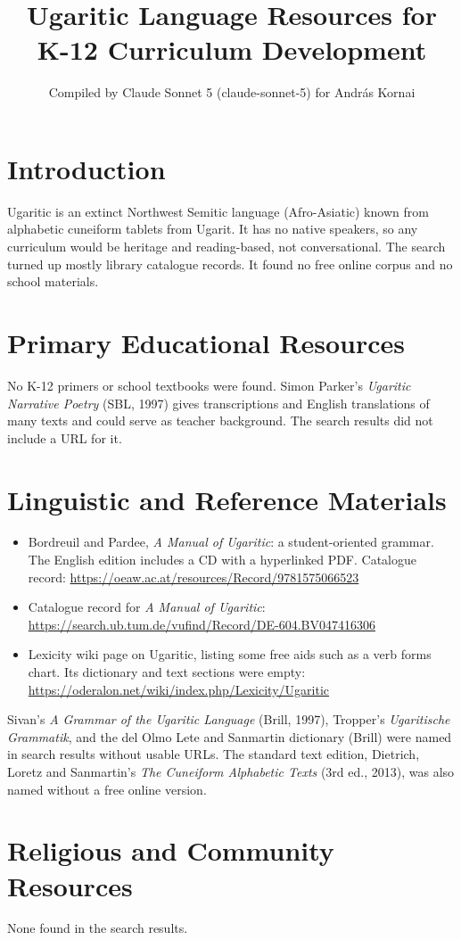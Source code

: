 \documentclass[12pt]{article}
\title{Ugaritic Language Resources for K-12 Curriculum Development}
\author{Compiled by Claude Sonnet 5 (claude-sonnet-5) for Andr\'as Kornai}
\date{}
\begin{document}
\maketitle
\section{Introduction}
Ugaritic is an extinct Northwest Semitic language (Afro-Asiatic) known from alphabetic cuneiform tablets from Ugarit. It has no native speakers, so any curriculum would be heritage and reading-based, not conversational. The search turned up mostly library catalogue records. It found no free online corpus and no school materials.
\section{Primary Educational Resources}
No K-12 primers or school textbooks were found. Simon Parker's \emph{Ugaritic Narrative Poetry} (SBL, 1997) gives transcriptions and English translations of many texts and could serve as teacher background. The search results did not include a URL for it.
\section{Linguistic and Reference Materials}
\begin{itemize}
\item Bordreuil and Pardee, \emph{A Manual of Ugaritic}: a student-oriented grammar. The English edition includes a CD with a hyperlinked PDF. Catalogue record: \url{https://oeaw.ac.at/resources/Record/9781575066523}
\item Catalogue record for \emph{A Manual of Ugaritic}: \url{https://search.ub.tum.de/vufind/Record/DE-604.BV047416306}
\item Lexicity wiki page on Ugaritic, listing some free aids such as a verb forms chart. Its dictionary and text sections were empty: \url{https://oderalon.net/wiki/index.php/Lexicity/Ugaritic}
\end{itemize}
Sivan's \emph{A Grammar of the Ugaritic Language} (Brill, 1997), Tropper's \emph{Ugaritische Grammatik}, and the del Olmo Lete and Sanmartin dictionary (Brill) were named in search results without usable URLs. The standard text edition, Dietrich, Loretz and Sanmartin's \emph{The Cuneiform Alphabetic Texts} (3rd ed., 2013), was also named without a free online version.
\section{Religious and Community Resources}
None found in the search results.
\end{document}
